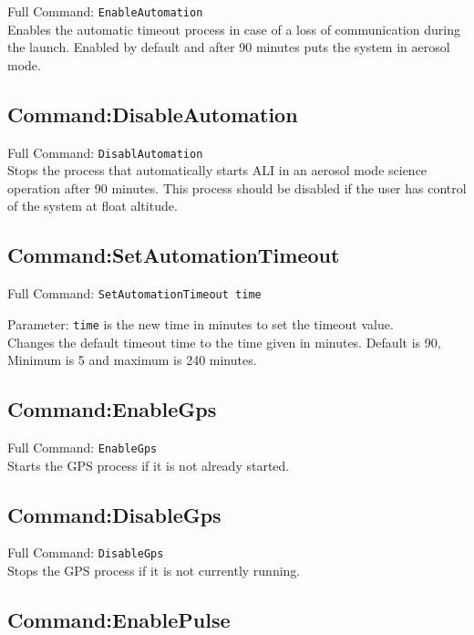 Full Command: \texttt{EnableAutomation}\\

Enables the automatic timeout process in case of a loss of communication during the launch. Enabled by default and after 90 minutes puts the system in aerosol mode.

\subsection{Command:DisableAutomation}

Full Command: \texttt{DisablAutomation}\\

Stops the process that automatically starts ALI in an aerosol mode science operation after 90 minutes. This process should be disabled if the user has control of the system at float altitude.

\subsection{Command:SetAutomationTimeout}

Full Command: \texttt{SetAutomationTimeout time}

Parameter: \texttt{time} is the new time in minutes to set the timeout value.\\

Changes the default timeout time to the time given in minutes. Default is 90, Minimum is 5 and maximum is 240 minutes.

\subsection{Command:EnableGps}

Full Command: \texttt{EnableGps}\\

Starts the GPS process if it is not already started.

\subsection{Command:DisableGps}

Full Command: \texttt{DisableGps}\\

Stops the GPS process if it is not currently running.

\subsection{Command:EnablePulse}

